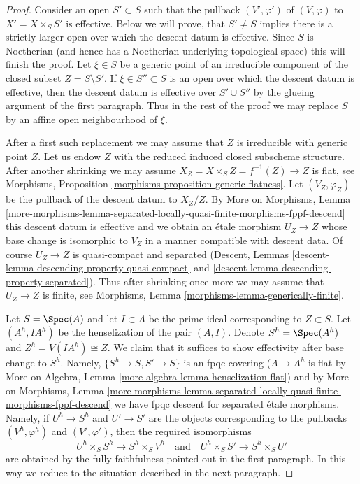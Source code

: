 \begin{proof}
\medskip\noindent
Consider an open $S' \subset S$ such that the pullback $(V', \varphi')$
of $(V, \varphi)$ to $X' = X \times_S S'$ is effective. Below we will
prove, that $S' \not = S$ implies there is a strictly larger open over
which the descent datum is effective. Since $S$ is Noetherian (and hence
has a Noetherian underlying topological space) this will finish the proof.
Let $\xi \in S$ be a generic point of an irreducible component of the
closed subset $Z = S \setminus S'$.
If $\xi \in S'' \subset S$ is an open over which the descent datum is
effective, then the descent datum is effective over
$S' \cup S''$ by the glueing argument of the first paragraph. Thus
in the rest of the proof we may replace $S$ by an affine open
neighbourhood of $\xi$.

\medskip\noindent
After a first such replacement we may assume that $Z$ is irreducible
with generic point $Z$. Let us endow $Z$ with the reduced induced
closed subscheme structure. After another shrinking we may assume
$X_Z = X \times_S Z = f^{-1}(Z) \to Z$ is flat, see
Morphisms, Proposition \ref{morphisms-proposition-generic-flatness}.
Let $(V_Z, \varphi_Z)$ be the pullback of the descent datum to $X_Z/Z$.
By More on Morphisms, Lemma
\ref{more-morphisms-lemma-separated-locally-quasi-finite-morphisms-fppf-descend}
this descent datum is effective and we obtain an \'etale morphism
$U_Z \to Z$ whose base change is isomorphic to $V_Z$ in a manner
compatible with descent data.
Of course $U_Z \to Z$ is quasi-compact and separated
(Descent, Lemmas \ref{descent-lemma-descending-property-quasi-compact} and
\ref{descent-lemma-descending-property-separated}).
Thus after shrinking once more we may assume
that $U_Z \to Z$ is finite, see
Morphisms, Lemma \ref{morphisms-lemma-generically-finite}.

\medskip\noindent
Let $S = \Spec(A)$ and let $I \subset A$ be the prime ideal corresponding
to $Z \subset S$. Let $(A^h, IA^h)$ be the henselization of the pair
$(A, I)$. Denote $S^h = \Spec(A^h)$ and $Z^h = V(IA^h) \cong Z$.
We claim that it suffices to show effectivity after base change to
$S^h$. Namely, $\{S^h \to S, S' \to S\}$ is an fpqc covering
($A \to A^h$ is flat by More on Algebra, Lemma
\ref{more-algebra-lemma-henselization-flat}) and
by More on Morphisms, Lemma
\ref{more-morphisms-lemma-separated-locally-quasi-finite-morphisms-fppf-descend}
we have fpqc descent for separated \'etale morphisms.
Namely, if $U^h \to S^h$ and $U' \to S'$ are the objects
corresponding to the pullbacks $(V^h, \varphi^h)$ and
$(V', \varphi')$, then the required isomorphisms
$$
U^h \times_S S^h \to S^h \times_S V^h
\quad\text{and}\quad
U^h \times_S S' \to S^h \times_S U'
$$
are obtained by the fully faithfulness pointed out in the first
paragraph. In this way we reduce to the situation described in
the next paragraph.


\end{proof}

